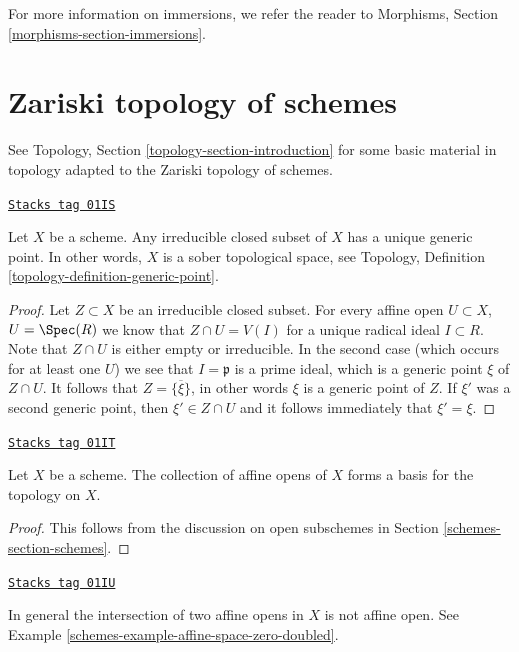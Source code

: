 \medskip\noindent
For more information on immersions, we refer the reader to
Morphisms, Section \ref{morphisms-section-immersions}.

\section{Zariski topology of schemes}
\label{schemes-section-topology}
See Topology, Section \ref{topology-section-introduction}
for some basic material in topology adapted to the Zariski
topology of schemes.

\begin{lemma}
\label{schemes-lemma-scheme-sober}
\href{https://stacks.math.columbia.edu/tag/01IS}{\texttt{Stacks tag 01IS}}

Let $X$ be a scheme.
Any irreducible closed subset of $X$ has a unique generic point.
In other words, $X$ is a sober topological space, see
Topology, Definition \ref{topology-definition-generic-point}.
\end{lemma}

\begin{proof}
Let $Z \subset X$ be an irreducible closed subset.
For every affine open $U \subset X$, $U = \Spec(R)$
we know that $Z \cap U = V(I)$ for a unique
radical ideal $I \subset R$. Note that $Z \cap U$ is either
empty or irreducible. In the second case (which occurs
for at least one $U$) we see that $I = \mathfrak p$
is a prime ideal, which is a generic point $\xi$ of $Z \cap U$.
It follows that $Z = \overline{\{\xi\}}$, in other words
$\xi$ is a generic point of $Z$. If $\xi'$ was a second
generic point, then $\xi' \in Z \cap U$ and it follows
immediately that $\xi' = \xi$.
\end{proof}

\begin{lemma}
\label{schemes-lemma-basis-affine-opens}
\href{https://stacks.math.columbia.edu/tag/01IT}{\texttt{Stacks tag 01IT}}

Let $X$ be a scheme. The collection of affine opens
of $X$ forms a basis for the topology on $X$.
\end{lemma}

\begin{proof}
This follows from the discussion on open subschemes
in Section \ref{schemes-section-schemes}.
\end{proof}

\begin{remark}
\label{schemes-remark-intersection-affine-opens}
\href{https://stacks.math.columbia.edu/tag/01IU}{\texttt{Stacks tag 01IU}}

In general the intersection of two affine opens in $X$
is not affine open. See Example \ref{schemes-example-affine-space-zero-doubled}.
\end{remark}

